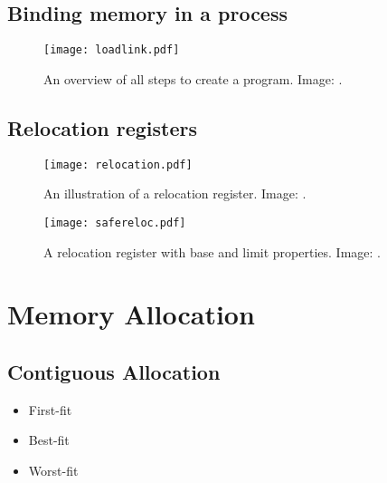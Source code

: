 \documentclass{beamer}
\begin{document}
\subsection{Binding memory in a process}

\begin{frame}{\insertsubsectionhead}
  \begin{figure}
    \texttt{[image: loadlink.pdf]}
    \caption{An overview of all steps to create a program.
      Image: \cite{Silberschatz2013osc}.}
  \end{figure}
\end{frame}

\subsection{Relocation registers}

\begin{frame}{\insertsubsectionhead}
  \begin{figure}
    \texttt{[image: relocation.pdf]}
    \caption{An illustration of a relocation register.
      Image: \cite{Silberschatz2013osc}.}
  \end{figure}
\end{frame}

\begin{frame}{\insertsubsectionhead}
  \begin{figure}
    \texttt{[image: safereloc.pdf]}
    \caption{A relocation register with base and limit properties.
      Image: \cite{Silberschatz2013osc}.}
  \end{figure}
\end{frame}


\section{Memory Allocation}

\subsection{Contiguous Allocation}

\begin{frame}{\insertsubsectionhead}
  \begin{itemize}
    \item First-fit
    \item Best-fit
    \item Worst-fit
  \end{itemize}
\end{frame}
\end{document}
